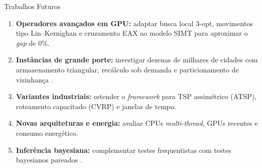 \begin{frame}{Trabalhos Futuros}
  \begin{enumerate}
    \item \textbf{Operadores avançados em GPU:} adaptar busca local $3$-opt, movimentos tipo Lin--Kernighan e cruzamento EAX \autocite{nagata2013powerful} ao modelo SIMT para aproximar o \emph{gap} de $0\%$.
    \item \textbf{Instâncias de grande porte:} investigar dezenas de milhares de cidades com armazenamento triangular, recálculo sob demanda e particionamento de vizinhança \autocite{schulz2013gpu,oneil2015rethinking}.
    \item \textbf{Variantes industriais:} estender o \emph{framework} para TSP assimétrico (ATSP), roteamento capacitado (CVRP) e janelas de tempo.
    \item \textbf{Novas arquiteturas e energia:} avaliar CPUs \emph{multi-thread}, GPUs recentes e consumo energético.
    \item \textbf{Inferência bayesiana:} complementar testes frequentistas com testes bayesianos pareados \autocite{benavoli2017time}.
  \end{enumerate}
\end{frame}
